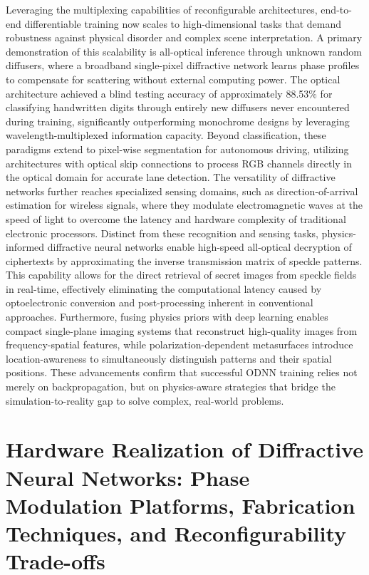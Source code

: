 \documentclass[11pt]{article}
\begin{document}
Leveraging the multiplexing capabilities of reconfigurable architectures, end-to-end differentiable training now scales to high-dimensional tasks that demand robustness against physical disorder and complex scene interpretation. A primary demonstration of this scalability is all-optical inference through unknown random diffusers, where a broadband single-pixel diffractive network learns phase profiles to compensate for scattering without external computing power. The optical architecture achieved a blind testing accuracy of approximately 88.53\% for classifying handwritten digits through entirely new diffusers never encountered during training, significantly outperforming monochrome designs by leveraging wavelength-multiplexed information capacity. Beyond classification, these paradigms extend to pixel-wise segmentation for autonomous driving, utilizing architectures with optical skip connections to process RGB channels directly in the optical domain for accurate lane detection. The versatility of diffractive networks further reaches specialized sensing domains, such as direction-of-arrival estimation for wireless signals, where they modulate electromagnetic waves at the speed of light to overcome the latency and hardware complexity of traditional electronic processors. Distinct from these recognition and sensing tasks, physics-informed diffractive neural networks enable high-speed all-optical decryption of ciphertexts by approximating the inverse transmission matrix of speckle patterns. This capability allows for the direct retrieval of secret images from speckle fields in real-time, effectively eliminating the computational latency caused by optoelectronic conversion and post-processing inherent in conventional approaches. Furthermore, fusing physics priors with deep learning enables compact single-plane imaging systems that reconstruct high-quality images from frequency-spatial features, while polarization-dependent metasurfaces introduce location-awareness to simultaneously distinguish patterns and their spatial positions. These advancements confirm that successful ODNN training relies not merely on backpropagation, but on physics-aware strategies that bridge the simulation-to-reality gap to solve complex, real-world problems. \citep{doi_10_1038_s41377_023_01116_3_aba67a18} \citep{doi_10_48550_arxiv_2602_07717_16cb1c7a} \citep{doi_10_1038_s41377_024_01511_4_2538a27d} \citep{doi_10_1364_oe_579297_3ffb4db0} \citep{doi_10_1117_12_3086084_f1b734fa} \citep{doi_10_1117_1_apn_5_1_016010_3e30c230}

\section{Hardware Realization of Diffractive Neural Networks: Phase Modulation Platforms, Fabrication Techniques, and Reconfigurability Trade-offs}\label{hardware-realization-of-diffractive-neural-networks-phase-modulation-platforms-fabrication-techniques-and-reconfigurability-trade-offs}
\end{document}
